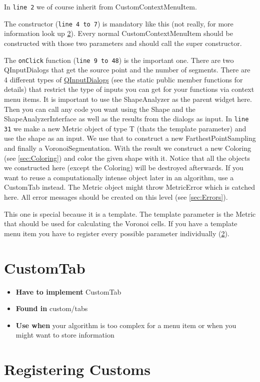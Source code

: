 In \texttt{line 2} we of course inherit from CustomContextMenuItem. 

The constructor (\texttt{line 4 to 7}) is mandatory like this (not really, for more information look up \ref{sec:RegisterCustoms}). Every normal CustomContextMenuItem should be constructed with those two parameters and should call the super constructor. 

The \texttt{onClick} function (\texttt{line 9 to 48}) is the important one. There are two QInputDialogs that get the source point and the number of segments. There are 4 different types of \href{http://qt-project.org/doc/qt-4.8/qinputdialog.html}{QInputDialogs} (see the static public member functions for details) that restrict the type of inputs you can get for your functions via context menu items. It is important to use the ShapeAnalyzer as the parent widget here. 
Then you can call any code you want using the Shape and the ShapeAnalyzerInterface as well as the results from the dialogs as input. In \texttt{line 31} we make a new Metric object of type T (thats the template parameter) and use the shape as an input. We use that to construct a new FarthestPointSampling and finally a VoronoiSegmentation. With the result we construct a new Coloring (see \ref{sec:Coloring}) and color the given shape with it. Notice that all the objects we constructed here (except the Coloring) will be destroyed afterwards. If you want to reuse a computationally intense object later in an algorithm, use a CustomTab instead.
The Metric object might throw MetricError which is catched here. All error messages should be created on this level (see \ref{sec:Errors}).

This one is special because it is a template. The template parameter is the Metric that should be used for calculating the Voronoi cells. If you have a template menu item you have to register every possible parameter individually (\ref{sec:RegisterCustoms}). 

\section{CustomTab}
\label{sec:CustomTab}

\begin{itemize}
	\item \textbf{Have to implement} CustomTab
	\item \textbf{Found in} custom/tabs
	\item \textbf{Use when} your algorithm is too complex for a menu item or when you might want to store information
\end{itemize}



\section{Registering Customs}
\label{sec:RegisterCustoms}